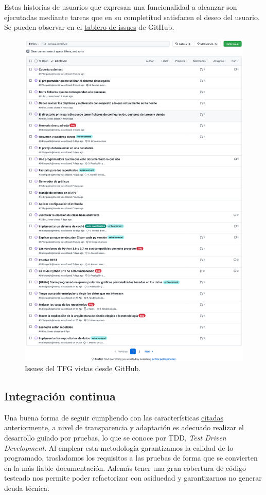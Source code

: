 Estas historias de usuarios que expresan una funcionalidad a alcanzar son ejecutadas
mediante tareas que en su completitud satisfacen el deseo del usuario. Se pueden observar en
el \href{https://github.com/pablojjimenez/TFG/issues}{tablero de issues} de GitHub.

\FloatBarrier
\begin{figure}[h]
	\centering
	\includegraphics[width=\textwidth]{doc/logos/imgs/issues.png}
	\caption{ Issues del TFG vistas desde GitHub. }
    \label{fig:issues-HU}
\end{figure}
\FloatBarrier


\subsection{Integración continua}
\label{sec:ci}
Una buena forma de seguir cumpliendo con las características \hyperref[sec:meto]{citadas
anteriormente}, a nivel de transparencia y adaptación es adecuado realizar el
desarrollo guiado por pruebas, lo que se conoce por TDD, \textit{Test Driven Development}.
Al emplear esta metodología garantizamos la calidad de lo programado, trasladamos los
requisitos a las pruebas de forma que se convierten en la más fiable documentación. Además
tener una gran cobertura de código testeado nos permite poder refactorizar con asiduedad y
garantizarnos no generar deuda técnica. 

